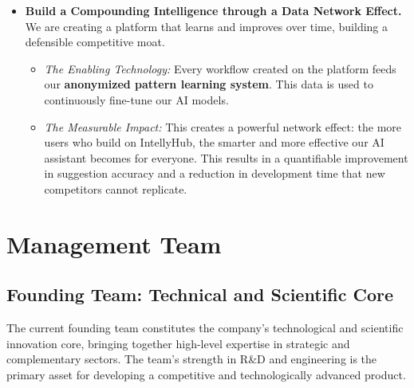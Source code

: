 \documentclass[11pt, a4paper, oneside]{article}
\begin{document}
\begin{itemize}
    \item \textbf{Build a Compounding Intelligence through a Data Network Effect.} We are creating a platform that learns and improves over time, building a defensible competitive moat.
    \begin{itemize}
        \item \textit{The Enabling Technology:} Every workflow created on the platform feeds our \textbf{anon\-ymized pattern learning system}. This data is used to continuously fine-tune our AI models.
        \item \textit{The Measurable Impact:} This creates a powerful network effect: the more users who build on IntellyHub, the smarter and more effective our AI assistant becomes for everyone. This results in a quantifiable improvement in suggestion accuracy and a reduction in development time that new competitors cannot replicate.
    \end{itemize}
\end{itemize}

\newpage
\section{Management Team}

\subsection{Founding Team: Technical and Scientific Core}

The current founding team constitutes the company's technological and scientific innovation core, bringing together high-level expertise in strategic and complementary sectors. The team's strength in R\&D and engineering is the primary asset for developing a competitive and technologically advanced product.
\end{document}
